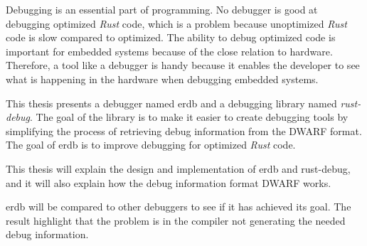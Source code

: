 Debugging is an essential part of programming.
No debugger is good at debugging optimized \emph{Rust} code, which is a problem because unoptimized \emph{Rust} code is slow compared to optimized.
The ability to debug optimized code is important for embedded systems because of the close relation to hardware.
Therefore, a tool like a debugger is handy because it enables the developer to see what is happening in the hardware when debugging embedded systems. 

This thesis presents a debugger named \acrshort{erdb} and a debugging library named \emph{rust-debug}.
The goal of the library is to make it easier to create debugging tools by simplifying the process of retrieving debug information from the \acrshort{DWARF} format.
The goal of \acrshort{erdb} is to improve debugging for optimized \emph{Rust} code. 

This thesis will explain the design and implementation of \acrshort{erdb} and rust-debug, and it will also explain how the debug information format \acrshort{DWARF} works.

\acrshort{erdb} will be compared to other debuggers to see if it has achieved its goal.
The result highlight that the problem is in the compiler not generating the needed debug information.
